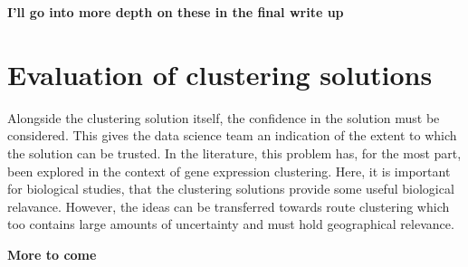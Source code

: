 \documentclass{report}
\begin{document}
    \textbf{I'll go into more depth on these in the final write up}


    \section{Evaluation of clustering solutions}

    Alongside the clustering solution itself, the confidence in the solution must be considered. This gives the data science team an indication of the extent to which the solution can be trusted. In the literature, this problem has, for the most part, been explored in the context of gene expression clustering. Here, it is important for biological studies, that the clustering solutions provide some useful biological relavance. However, the ideas can be transferred towards route clustering which too contains large amounts of uncertainty and must hold geographical relevance. 


    \textbf{More to come}
\end{document}
